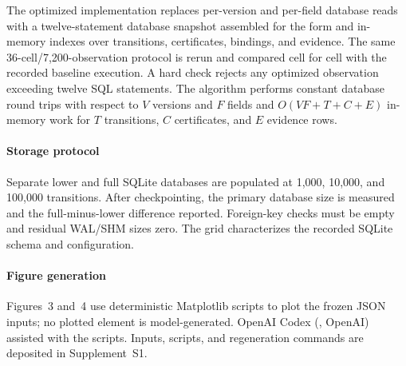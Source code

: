 The optimized implementation replaces per-version and per-field database reads with a twelve-statement database snapshot assembled for the form and in-memory indexes over transitions, certificates, bindings, and evidence. The same 36-cell/7,200-observation protocol is rerun and compared cell for cell with the recorded baseline execution. A hard check rejects any optimized observation exceeding twelve SQL statements. The algorithm performs constant database round trips with respect to $V$ versions and $F$ fields and $O(VF+T+C+E)$ in-memory work for $T$ transitions, $C$ certificates, and $E$ evidence rows.

\paragraph{Storage protocol}
Separate lower and full SQLite databases are populated at 1,000, 10,000, and 100,000 transitions. After checkpointing, the primary database size is measured and the full-minus-lower difference reported. Foreign-key checks must be empty and residual WAL/SHM sizes zero. The grid characterizes the recorded SQLite schema and configuration.

\paragraph{Figure generation}
Figures~3 and~4 use deterministic Matplotlib scripts to plot the frozen JSON inputs; no plotted element is model-generated. OpenAI Codex (, OpenAI) assisted with the scripts. Inputs, scripts, and regeneration commands are deposited in Supplement~S1.

